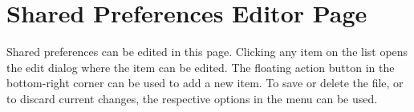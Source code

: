 \section{Shared Preferences Editor Page}\label{sec:shared-preferences-editor-page} %
Shared preferences can be edited in this page. Clicking any item on the list opens the edit dialog where the item can be
edited. The floating action button in the bottom-right corner can be used to add a new item. To save or delete the file,
or to discard current changes, the respective options in the menu can be used.
